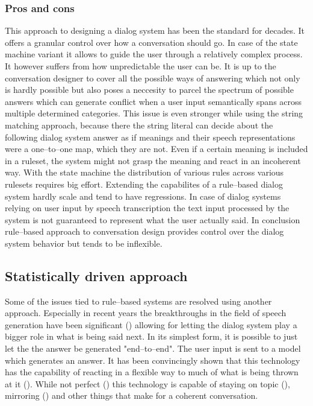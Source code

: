 \documentclass[12pt]{report}
\begin{document}
{\subsubsection{Pros and cons}

\par
This approach to designing a dialog system
has been the standard for decades.
It offers a granular control over how a conversation should go.
In case of the state machine variant it
allows to guide the user through a relatively complex process.
It however suffers from how unpredictable the user can be.
It is up to the conversation designer to cover all the possible ways of answering
which not only is hardly possible
but also poses a neccesity to parcel the spectrum of possible answers
which can generate conflict when
a user input semantically spans across multiple determined categories.
This issue is even stronger while using the string matching approach,
because there the string literal can decide about the following dialog system answer
as if meanings and their speech representations were a one–to–one map,
which they are not.
Even if a certain meaning is included in a ruleset,
the system might not grasp the meaning and react in an incoherent way.
With the state machine the
distribution of various rules across various rulesets
requires big effort.
Extending the capabilites of a rule–based dialog system
hardly scale and tend to have regressions.
In case of dialog systems relying on user input by speech transcription
the text input processed by the system is not guaranteed to represent
what the user actually said.
In conclusion rule–based approach to conversation design
provides control over the dialog system behavior
but tends to be inflexible.

\subsection{Statistically driven approach}

Some of the issues tied to rule–based systems
are resolved using another approach.
Especially in recent years the breakthroughs in the field
of speech generation have been significant ()
allowing for letting the dialog system play a bigger role
in what is being said next.
In its simplest form,
it is possible to just let the the answer be generated "end–to–end".
The user input is sent to a model which generates an answer.
It has been convincingly shown that this technology has the capability
of reacting in a flexible way to much of what is being thrown at it ().
While not perfect ()
this technology is capable of staying on topic (), mirroring ()
and other things that make for a coherent conversation.

}
\end{document}
